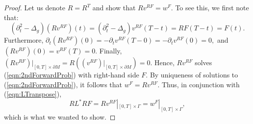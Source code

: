 \documentclass[final,leqno]{siamart1116}
\begin{document}
\begin{proof}
  Let us denote $R = R^T$ and show that $Rv^{RF} = w^F$. To see this,
  we first note that:
  \begin{equation*}
      ({\partial}_t^2 - {\Delta_{g}})(Rv^{RF})(t) = ({\partial}_t^2 -
    {\Delta_{g}})v^{RF}(T - t) = RF(T - t) = F(t).
  \end{equation*}
  Furthermore, ${\partial}_t (Rv^{RF})(0) = - {\partial}_t v^{RF}(T - 0) = -{\partial}_t
  v^{RF}(0) = 0,$ and $(Rv^{RF})(0) = v^{RF}(T) = 0$. Finally,
  $(Rv^{RF})|_{[0,T] \times {\partial} M} = R((v^{RF})|_{[0,T] \times {\partial} M}) =
  0$. Hence, $Rv^{RF}$ solves (\ref{eqn:2ndForwardProb}) with
  right-hand side $F$. By uniqueness of solutions to
  (\ref{eqn:2ndForwardProb}), it follows that $w^F = Rv^{RF}$. Thus,
  in conjunction with (\ref{eqn:LTranspose}),
  \begin{equation*}
    RL^*RF = Rv^{RF}|_{[0,T] \times \Gamma} = w^F|_{[0,T] \times
      \Gamma},
  \end{equation*}
  which is what we wanted to show. \qquad
\end{proof} 
\end{document}
